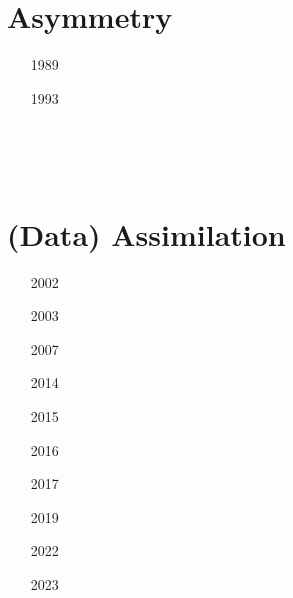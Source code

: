 \section{Asymmetry}
\label{sec:topics:asymmetry}

\begin{small}
\begin{itemize}
\item[1989]
\item[1993]
\item[\twothousandthree]
\item[\twothousandsix]
\item[\twothousandeight]
 \\ 
\item[\twothousandeleven]
\item[\twothousandfourteen]
  \\
\item[\twothousandfifteen]
\item[\twothousandsixteen]
\end{itemize}
\end{small}



\section{(Data) Assimilation}

\begin{small}
\begin{itemize}
\item[2002]
\item[2003]
\item[2007]
\item[2014]
\item[2015]
\item[2016]
\item[2017]
\item[2019]
\item[2022]
\item[2023]
\end{itemize}
\end{small}

